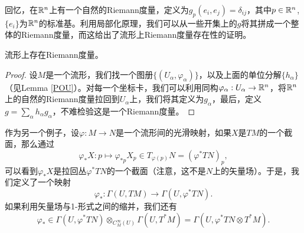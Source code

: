 	回忆，在$\mathbb{R}^n$上有一个自然的Riemann度量，定义为$g_p(e_i,e_j)=\delta_{ij}$，其中$p\in \mathbb{R}^n$, $\{e_i\}$为$\mathbb{R}^n$的标准基。利用局部化原理，我们可以从一些开集上的$g$将其拼成一个整体的Riemann度量，而这给出了流形上Riemann度量存在性的证明。
	
	\begin{lem}
		流形上存在Riemann度量。
	\end{lem}
	
	\begin{proof}
		设$M$是一个流形，我们找一个图册$\{(U_\alpha,\varphi_\alpha)\}$，以及上面的单位分解$\{h_\alpha\}$（见Lemma \ref{POU}）。对每一个坐标卡，我们可以利用同构$\varphi_\alpha:U_\alpha\to \mathbb{R}^n$，将$\mathbb{R}^n$上的自然的Riemann度量拉回到$U_\alpha$上，我们将其定义为$g_\alpha$，最后，定义$g=\sum_{\alpha}h_\alpha g_{\alpha}$，不难检验这是一个Riemann度量。
	\end{proof}
	
	\begin{para}[作为截面的推前]
	作为另一个例子，设$\varphi:M\to N$是一个流形间的光滑映射，如果$X$是$TM$的一个截面，那么通过
	\[
		\varphi_* X:p\mapsto \varphi_{*p}X_p\in T_{\varphi(p)}N=(\varphi^*TN)_p,
	\]
	可以看到$\varphi_* X$是拉回丛$\varphi^*TN$的一个截面（注意，这不是$N$上的矢量场）。于是，我们定义了一个映射
	\[
		\varphi_*:\Gamma(U,TM)\to \Gamma(U,\varphi^*TN).
	\]
	如果利用矢量场与1-形式之间的缩并，我们还有
	\[
		\varphi_*\in \Gamma(U,\varphi^*TN)\otimes_{C^\infty_M(U)} \Gamma(U,T^*M)=\Gamma(U,\varphi^*TN\otimes T^*M).
	\]
	\end{para}